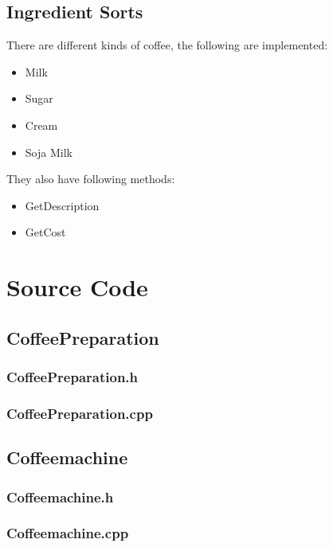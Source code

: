 \subsection{Ingredient Sorts}
There are different kinds of coffee, the following are implemented:
\begin{itemize}
	\item Milk
	\item Sugar
	\item Cream
	\item Soja Milk
\end{itemize}

They also have following methods:
\begin{itemize}
	\item GetDescription
	\item GetCost
\end{itemize}

\newpage

\section{Source Code}

\subsection{CoffeePreparation}
\subsubsection{CoffeePreparation.h}
\subsubsection{CoffeePreparation.cpp}
\newpage

\subsection{Coffeemachine}
\subsubsection{Coffeemachine.h}
\subsubsection{Coffeemachine.cpp}
\newpage

